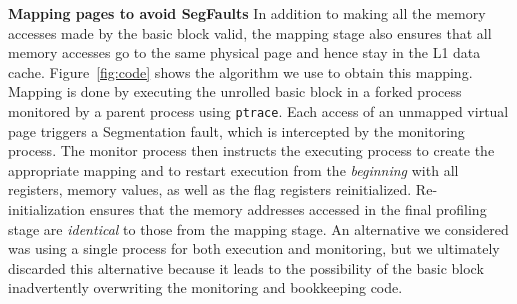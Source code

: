 \textbf{Mapping pages to avoid SegFaults}
In addition to making all the memory accesses made by the basic block valid,
the mapping stage also ensures that all memory accesses go to the same physical page and hence stay in the L1 data cache. 
Figure~\ref{fig:code} shows the algorithm we use to obtain this mapping.
Mapping is done by executing the unrolled basic block in a forked process
 monitored by a parent process using \verb|ptrace|.
Each access of an unmapped virtual page triggers a Segmentation fault, which is intercepted by
the monitoring process. The monitor process then instructs the 
executing process to create the appropriate mapping
and to restart execution from the \textit{beginning}
with all registers, memory values,
as well as the flag registers reinitialized.
Re-initialization ensures that the memory addresses accessed in the final profiling
stage are \textit{identical} to those from the mapping stage.
An alternative we considered was using a single process for both execution
and monitoring, but we ultimately discarded this alternative because
it leads to the possibility of the basic block inadvertently overwriting
the monitoring and bookkeeping code.



%    
%    
%    
%    
%    

